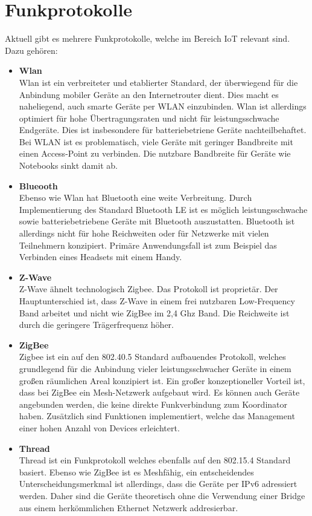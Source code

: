 \section{Funkprotokolle}
Aktuell gibt es mehrere Funkprotokolle, welche im Bereich IoT relevant sind. Dazu gehören:
\begin{itemize}
    \item \textbf{Wlan} \\
    Wlan ist ein verbreiteter und etablierter Standard, der überwiegend für die Anbindung mobiler Geräte an den
    Internetrouter dient. Dies macht es naheliegend, auch smarte Geräte per WLAN einzubinden. Wlan ist allerdings 
    optimiert für hohe Übertragungsraten und nicht für leistungsschwache Endgeräte. Dies ist
    insbesondere für batteriebetriene Geräte nachteilbehaftet. Bei WLAN ist es problematisch, viele Geräte mit geringer Bandbreite mit einen Access-Point zu verbinden.
    Die nutzbare Bandbreite für Geräte wie Notebooks sinkt damit ab. 

    \item \textbf{Blueooth}\\
    Ebenso wie Wlan hat Bluetooth eine weite Verbreitung. Durch Implementierung 
    des Standard Bluetooth LE ist es möglich leistungsschwache sowie batteriebetriebene Geräte mit Bluetooth auszustatten. Bluetooth
    ist allerdings nicht für hohe Reichweiten oder für Netzwerke mit vielen Teilnehmern konzipiert. Primäre Anwendungsfall ist zum Beispiel das Verbinden eines Headsets mit 
    einem Handy. 

    \item \textbf{Z-Wave}\\
    
    Z-Wave \cite{zwave} ähnelt technologisch Zigbee. Das Protokoll ist proprietär. Der Hauptunterschied ist, dass Z-Wave in einem frei nutzbaren
    Low-Frequency Band arbeitet und nicht wie ZigBee im 2,4 Ghz Band. Die Reichweite ist durch die geringere Trägerfrequenz höher.

    \item \textbf{ZigBee}\\
    Zigbee \cite{zigbee} ist ein auf den 802.40.5 Standard aufbauendes Protokoll, welches grundlegend für die Anbindung vieler leistungsschwacher
    Geräte in einem großen räumlichen Areal konzipiert ist. Ein großer konzeptioneller Vorteil ist, dass bei 
    ZigBee ein Mesh-Netzwerk aufgebaut wird. Es können auch Geräte angebunden werden, die keine direkte Funkverbindung
    zum Koordinator haben. Zusätzlich sind Funktionen implementiert, welche das Management einer hohen Anzahl von Devices
    erleichtert.
    
    \item \textbf{Thread}\\
    Thread \cite{thread} ist ein Funkprotokoll welches ebenfalls auf den 802.15.4 Standard basiert. Ebenso wie ZigBee ist es Meshfähig, ein
    entscheidendes Unterscheidungsmerkmal ist allerdings, dass die Geräte per IPv6 adressiert werden. Daher sind die Geräte
    theoretisch ohne die Verwendung einer Bridge aus einem herkömmlichen Ethernet Netzwerk addresierbar.
\end{itemize}

